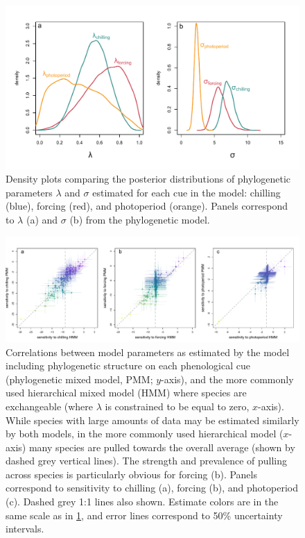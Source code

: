 \documentclass[11pt]{article}
\begin{document}
\begin{figure} 
  \begin{center}
  \includegraphics[width=14cm]{../../analyses/phylogeny/figures/Fig2_lambdas_sigmas.pdf}
  \caption{Density plots comparing the posterior distributions of phylogenetic parameters $\lambda$ and $\sigma$ estimated for each cue in the model: chilling (blue), forcing (red), and photoperiod (orange). Panels correspond to $\lambda$ (a) and $\sigma$ (b) from the phylogenetic model.}
  \label{fig:phylosig_all}
  \end{center}
\end{figure}

\begin{figure} 
  \begin{center}
  \includegraphics[width=14cm]{../../analyses/phylogeny/figures/Fig3_correlations_lambestvslamb0_cols.pdf}
  \caption{Correlations between model parameters as estimated by the model including phylogenetic structure on each phenological cue (phylogenetic mixed model, PMM; $y$-axis), and the more commonly used hierarchical mixed model (HMM) where species are exchangeable (where $\lambda$ is constrained to be equal to zero, $x$-axis). While species with large amounts of data may be estimated similarly by both models, in the more commonly used hierarchical model ($x$-axis) many species are pulled towards the overall average (shown by dashed grey vertical lines). The strength and prevalence of pulling across species is particularly obvious for forcing (b). Panels correspond to sensitivity to chilling (a), forcing (b), and photoperiod (c). Dashed grey 1:1 lines also shown. Estimate colors are in the same scale as in \ref{fig:phylosig_all}, and error lines correspond to 50\% uncertainty intervals.}
  \label{fig:correls_angio}
  \end{center}
\end{figure}
\end{document}
